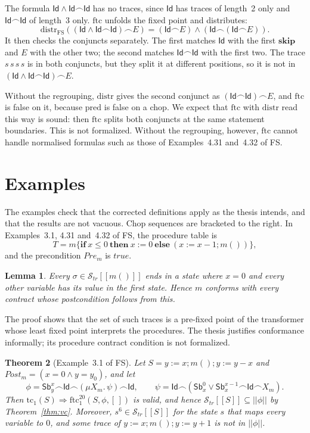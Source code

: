 \documentclass[11pt]{article}
\newcommand{\sem}[1]{[\![ #1 ]\!]}
\newcommand{\fsem}[1]{|\!|#1|\!|}
\newcommand{\Str}{{\mathcal{S}_{\mathit{tr}}}}
\newcommand{\chop}{\smallfrown}
\newcommand{\Id}{\mathsf{Id}}
\newcommand{\Sb}[2]{\mathsf{Sb}^{#1}_{#2}}
\newcommand{\kw}[1]{\mathbf{#1}}
\newcommand{\skipS}{\kw{skip}}
\newcommand{\ite}[3]{\kw{if}\ #1\ \kw{then}\ #2\ \kw{else}\ #3}
\newcommand{\call}[1]{#1()}
\newcommand{\Pre}{\mathit{Pre}}
\newcommand{\Post}{\mathit{Post}}
\newcommand{\tc}{\mathrm{tc}}
\newcommand{\ftc}{\mathrm{ftc}}
\newcommand{\pred}{\mathrm{pred}}
\newcommand{\distr}{\mathrm{distr}}
\newcommand{\Th}[1]{#1 of FS}
\theoremstyle{plain}
\newtheorem{theorem}{Theorem}[section]
\newtheorem{lemma}[theorem]{Lemma}
\theoremstyle{definition}
\theoremstyle{remark}
\begin{document}
The formula $\Id \land \Id\chop\Id$ has no traces, since $\Id$ has traces
of length~2 only and $\Id\chop\Id$ of length~3 only. $\ftc$ unfolds the
fixed point and distributes:
\[
  \distr_{\mathrm{FS}}((\Id \land \Id\chop\Id)\chop E) =
  (\Id\chop E) \land (\Id\chop(\Id\chop E)).
\]
It then checks the conjuncts separately. The first matches $\Id$ with the
first $\skipS$ and $E$ with the other two; the second matches
$\Id\chop\Id$ with the first two. The trace $s\,s\,s\,s$ is in both
conjuncts, but they split it at different positions, so it is not in
$(\Id \land \Id\chop\Id)\chop E$.

Without the regrouping, $\distr$ gives the second conjunct as
$(\Id\chop\Id)\chop E$, and $\ftc$ is false on it, because $\pred$ is false
on a chop. We expect that $\ftc$ with $\distr$ read this way is sound: then
$\ftc$ splits both conjuncts at the same statement boundaries. This is not
formalized. Without the regrouping, however, $\ftc$ cannot handle
normalised formulas such as those of \Th{Examples~4.31 and~4.32}.

\section{Examples}\label{sec:examples}

The examples check that the corrected definitions apply as the thesis
intends, and that the results are not vacuous. Chop sequences are
bracketed to the right. In \Th{Examples~3.1, 4.31 and~4.32}, the
procedure table is
\[
  T = m\{\ite{x \le 0}{x := 0}{(x := x - 1; \call{m})}\},
\]
and the precondition $\Pre_m$ is $\mathit{true}$.

\begin{lemma}\label{lem:m-conf}
  Every $\sigma \in \Str\sem{\call{m}}$ ends in a state where $x = 0$ and
  every other variable has its value in the first state. Hence $m$
  conforms with every contract whose postcondition follows from this.
\end{lemma}

The proof shows that the set of such traces is a pre-fixed point of the
transformer whose least fixed point interprets the procedures. The thesis
justifies conformance informally; its procedure contract condition is not
formalized.

\begin{theorem}[\Th{Example~3.1}]\label{thm:ex31}
  Let $S = y := x; \call{m}; y := y - x$ and $\Post_m = (x = 0 \land y =
  y_0)$, and let
  \[
    \phi = \Sb{x}{y}\chop\Id\chop(\mu X_m.\,\psi)\chop\Id, \qquad
    \psi = \Id\chop(\Sb{0}{x} \lor \Sb{x-1}{x}\chop\Id\chop X_m).
  \]
  Then $\tc_1(S) \Rightarrow \ftc^{20}_1(S, \phi, [\,])$ is valid, and
  hence $\Str\sem{S} \subseteq \fsem{\phi}$ by Theorem~\ref{thm:vc}.
  Moreover, $s^6 \in \Str\sem{S}$ for the state $s$ that maps every
  variable to $0$, and some trace of $y := x; \call{m}; y := y + 1$ is not
  in $\fsem{\phi}$.
\end{theorem}
\end{document}
